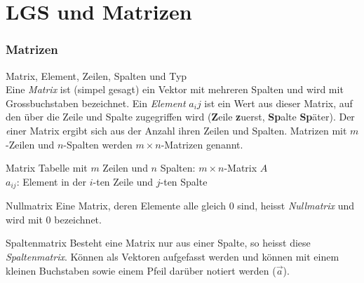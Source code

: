 
\section{LGS und Matrizen}

\subsubsection*{Matrizen}

    \begin{definition}{{Matrix, Element, Zeilen, Spalten und Typ}}\\
        Eine \textit{Matrix} ist (simpel gesagt) ein Vektor mit mehreren Spalten 
        und wird mit Grossbuchstaben bezeichnet.
        Ein \textit{Element} $a_ij$ ist ein Wert aus dieser Matrix,
        auf den über die Zeile und Spalte zugegriffen wird (\textbf{Z}eile \textbf{z}uerst,
        \textbf{Sp}alte \textbf{Sp}äter).
        Der \textit einer Matrix ergibt sich aus der Anzahl ihren Zeilen und Spalten.
        Matrizen mit $m$-Zeilen und $n$-Spalten werden $m\times n$-Matrizen genannt.
    \end{definition}

    \begin{concept}{Matrix}
        Tabelle mit $m$ Zeilen und $n$ Spalten: $m \times n$-Matrix $A$\\
        $a_{ij}$: Element in der $i$-ten Zeile und $j$-ten Spalte
    \end{concept}

    \begin{definition}{Nullmatrix}
        Eine Matrix, deren Elemente alle gleich $0$ sind, heisst \textit{Nullmatrix} und wird mit $0$ bezeichnet.
    \end{definition}

    \begin{definition}{Spaltenmatrix}
        Besteht eine Matrix nur aus einer Spalte, so heisst diese \textit{Spaltenmatrix}.
        Können als Vektoren aufgefasst werden und können mit einem kleinen Buchstaben 
        sowie einem Pfeil darüber notiert werden ($\vec{a}$). 
    \end{definition}
    
